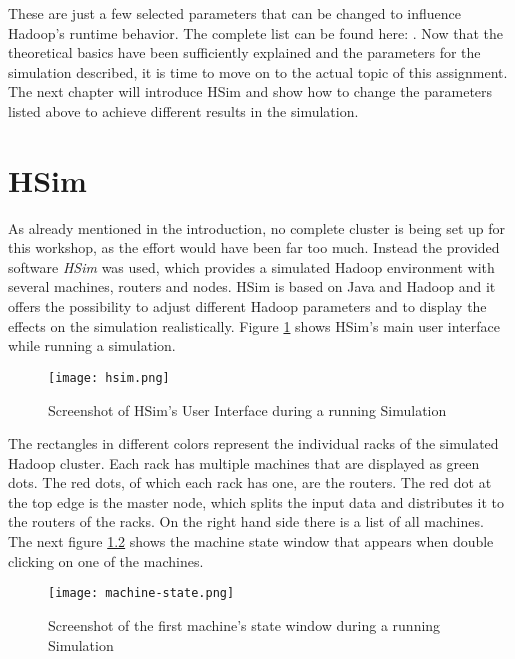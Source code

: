 These are just a few selected parameters that can be changed to influence Hadoop's runtime behavior. The complete list can be found here: \cite[see][]{AP03}. Now that the theoretical basics have been sufficiently explained and the parameters for the simulation described, it is time to move on to the actual topic of this assignment. The next chapter will introduce HSim and show how to change the parameters listed above to achieve different results in the simulation.
\chapter{HSim}
\label{hsim}
As already mentioned in the introduction, no complete cluster is being set up for this workshop, as the effort would have been far too much. Instead the provided software \textit{HSim} was used, which provides a simulated Hadoop environment with several machines, routers and nodes. HSim is based on Java and Hadoop and it offers the possibility to adjust different Hadoop parameters and to display the effects on the simulation realistically. Figure \ref{hsim} shows HSim's main user interface while running a simulation.
\begin{figure}[H]
	\centering
	\texttt{[image: hsim.png]}
	\caption[Caption for LOF]{Screenshot of HSim's User Interface during a running Simulation}
	\label{hsim-pic}
\end{figure}
The rectangles in different colors represent the individual racks of the simulated Hadoop cluster. Each rack has multiple machines that are displayed as green dots. The red dots, of which each rack has one, are the routers. The red dot at the top edge is the master node, which splits the input data and distributes it to the routers of the racks. On the right hand side there is a list of all machines. The next figure \ref{machine-state} shows the machine state window that appears when double clicking on one of the machines.
\begin{figure}[H]
	\centering
	\texttt{[image: machine-state.png]}
	\caption[Caption for LOF]{Screenshot of the first machine's state window during a running Simulation}
	\label{machine-state}
\end{figure}
